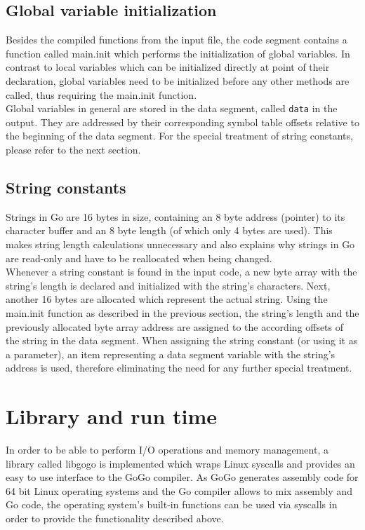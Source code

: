 \documentclass[a4paper]{scrreprt}
\begin{document}
    \section{Global variable initialization}
        Besides the compiled functions from the input file, the code segment contains a function called main.init which performs the initialization of global variables. In contrast to local variables which can be initialized directly at point of their declaration, global variables need to be initialized before any other methods are called, thus requiring the main.init function.\\
        Global variables in general are stored in the data segment, called \texttt{data} in the output. They are addressed by their corresponding symbol table offsets relative to the beginning of the data segment. For the special treatment of string constants, please refer to the next section.

    \section{String constants} \label{String constants}
        Strings in Go are 16 bytes in size, containing an 8 byte address (pointer) to its character buffer and an 8 byte length (of which only 4 bytes are used). This makes string length calculations unnecessary and also explains why strings in Go are read-only and have to be reallocated when being changed.\\
        Whenever a string constant is found in the input code, a new byte array with the string's length is declared and initialized with the string's characters. Next, another 16 bytes are allocated which represent the actual string. Using the main.init function as described in the previous section, the string's length and the previously allocated byte array address are assigned to the according offsets of the string in the data segment. When assigning the string constant (or using it as a parameter), an item representing a data segment variable with the string's address is used, therefore eliminating the need for any further special treatment.

  \chapter{Library and run time}
    In order to be able to perform I/O operations and memory management, a library called libgogo is implemented which wraps Linux syscalls and provides an easy to use interface to the GoGo compiler. As GoGo generates assembly code for 64 bit Linux operating systems and the Go compiler allows to mix assembly and Go code, the operating system's built-in functions can be used via syscalls in order to provide the functionality described above.
\end{document}
